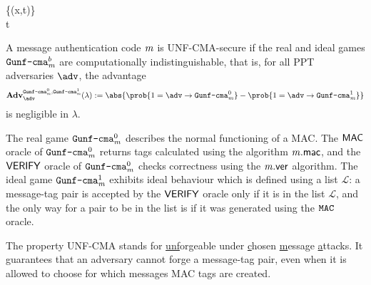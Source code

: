 \begin{security}
\begin{codebox}
\begin{center}
\begin{pchstack}
\begin{pcvstack}
{      \gets{}\cup\{(x,t)\}\\
      \pcreturn t}
      \pcvspace
  \end{pcvstack}
  \end{pchstack}
  \end{center} 
\end{codebox}
\vspace{5mm}
A message authentication code $\mathit{{m}}$ is UNF-CMA-secure if the real and ideal games $\text{\texttt{Gunf\text{-}cma}}^b_{\mathit{{m}}}$ are computationally indistinguishable, that is, for all PPT adversaries $\adv$, the advantage
\[\mathbf{Adv}_{\adv}^{
  \M{Gunf\text{-}cma}^0_\m,
  \M{Gunf\text{-}cma}^1_\m}
	(\lambda):=\abs{\prob{1=\adv\circ \M{Gunf\text{-}cma}^0_\m}-\prob{1=\adv\circ \M{Gunf\text{-}cma}^1_\m}}\]
is negligible in $\lambda$.
\end{security}

\begin{remark}
  The real game $\text{\texttt{Gunf\text{-}cma}}^0_{\mathit{{m}}}$ describes the normal functioning of a MAC. The $\mathsf{MAC}$ oracle of $\text{\texttt{Gunf\text{-}cma}}^0_{\mathit{{m}}}$ returns tags calculated using the algorithm $\mathit{{m}}.\mathsf{mac}$, and the $\mathsf{VERIFY}$ oracle of $\text{\texttt{Gunf\text{-}cma}}^0_{\mathit{{m}}}$  checks correctness using the $\mathit{{m}}.\mathsf{ver}$ algorithm. The ideal game $\text{\texttt{Gunf\text{-}cma}}^1_{\mathit{{m}}}$ exhibits ideal behaviour which is defined using a list $\mathcal{L}$: a message-tag pair is accepted by the $\mathsf{VERIFY}$ oracle only if it is in the list $\mathcal{L}$, and the only way for a pair to be in the list is if it was generated using the $\text{\texttt{MAC}}$ oracle.
\end{remark}

\begin{remark}
  The property UNF-CMA stands for \underline{unf}orgeable under \underline{c}hosen \underline{m}essage \underline{a}ttacks. It guarantees that an adversary cannot forge a message-tag pair, even when it is allowed to choose for which messages MAC tags are created.
\end{remark}

